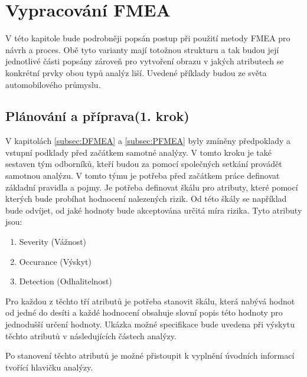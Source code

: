 \chapter{Vypracování FMEA }
\label{sec:FMEA_postup}
V této kapitole bude podrobněji popsán postup při použití metody FMEA pro návrh a proces. Obě tyto varianty mají totožnou strukturu a tak budou její jednotlivé části popsány zároveň pro vytvoření obrazu v jakých atributech se konkrétní prvky obou typů analýz liší. Uvedené příklady budou ze světa automobilového průmyslu. 

\section{Plánování a příprava(1. krok)}
V kapitolách \ref{subsec:DFMEA} a \ref{subsec:PFMEA}  byly zmíněny předpoklady a vstupní podklady před začátkem samotné analýzy. V tomto kroku je také sestaven tým odborníků, kteří budou za pomocí společných setkání provádět samotnou analýzu. V tomto týmu je potřeba před začátkem práce definovat základní pravidla a pojmy. Je potřeba definovat škálu pro atributy, které pomocí kterých bude probíhat hodnocení nalezených rizik. Od této škály se například bude odvíjet, od jaké hodnoty bude akceptována určitá míra rizika. Tyto atributy jsou: 

\begin{enumerate}
	\item Severity (Vážnost)
	\item Occurance (Výskyt)
	\item Detection (Odhalitelnost)
\end{enumerate}

Pro každou z těchto tří atributů je potřeba stanovit škálu, která nabývá hodnot od jedné do desíti a každé hodnocení obsahuje slovní popis této hodnoty pro jednodušší určení hodnoty. Ukázka možné specifikace bude uvedena při výskytu těchto atributů v následujících částech analýzy.  

Po stanovení těchto atributů je možné přistoupit k vyplnění úvodních informací tvořící hlavičku analýzy. 

